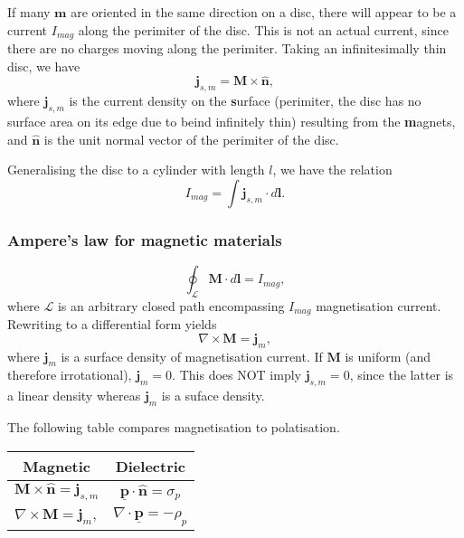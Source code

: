 \documentclass[a4paper, 12pt]{article}
\renewcommand{\vec}[1]{\mathbf{#1}}
\newcommand{\p}{\ensuremath{\vec{\underline{p}}}}
\renewcommand{\j}{\ensuremath{\vec{j}}}
\let\tmp\hat
\renewcommand{\hat}[1]{\vec{\tmp{#1}}}
\begin{document}
            If many $\vec{m}$ are oriented in the same direction on a disc, 
            there will appear to be a current $I_{mag}$ along the perimiter of the disc. 
            This is not an actual current, since there are no charges moving along the perimiter.
            Taking an infinitesimally thin disc, we have 
            \begin{equation}
                \j_{s, m} = \vec{M}\times\hat{n},
            \end{equation}
            where $\j_{s, m}$ is the current density on the \textbf{s}urface 
            (perimiter, the disc has no surface area on its edge due to beind infinitely thin) 
            resulting from the \textbf{m}agnets, and $\hat{n}$ is the unit normal vector of the perimiter of the disc. 

            Generalising the disc to a cylinder with length $l$, we have the relation
            \begin{equation}
                I_{mag} = \int \j_{s, m}\cdot d\vec{l}.
            \end{equation}

        \subsubsection{Ampere's law for magnetic materials}
            \begin{equation}
                \oint_\mathcal{L}\vec{M}\cdot d\vec{l} = I_{mag},
            \end{equation}
            where $\mathcal{L}$ is an arbitrary closed path encompassing $I_{mag}$ magnetisation current. 
            Rewriting to a differential form yields
            \begin{equation}
                \nabla \times \vec{M} = \j_m,
            \end{equation}
            where $\j_m$ is a surface density of magnetisation current. 
            If $\vec{M}$ is uniform (and therefore irrotational), $\j_m = 0$. 
            This does NOT imply $\j_{s, m} = 0$, since the latter is a linear density whereas $\j_m$ is a suface density.

            The following table compares magnetisation to polatisation.
            \begin{center}
                \begin{tabular}{ c|c } 
                Magnetic & Dielectric \\
                \hline
                 $\vec{M}\times\hat{n} = \j_{s, m}$ & $\p \cdot \hat{n} = \sigma_p$ \\
                 $\nabla \times \vec{M} = \j_m,$ & $\nabla \cdot \p = -\rho_p$
                \end{tabular}
            \end{center}
\end{document}
